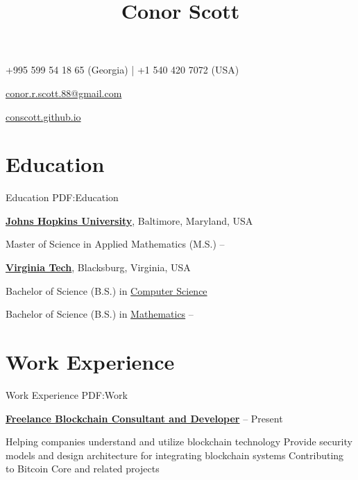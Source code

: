 \documentclass[a4paper,10pt,oneside]{article}
\begin{document}
\begin{minipage}[t][0pt]{\linewidth}


\title{Conor Scott}

\begin{subtitle}
+995 599 54 18 65 (Georgia) | +1 540 420 7072 (USA)
\par
\href{mailto:conor.r.scott.88@gmail.com}
{conor.r.scott.88@gmail.com}
\par
\href{https://conscott.github.io}
{conscott.github.io}
\end{subtitle}
\begin{body}


\section
{Education}
{Education}
{PDF:Education}

\href{https://www.jhu.edu/}
{\textbf{Johns Hopkins University}},
Baltimore, Maryland, USA

\SmallEntryGap
Master of Science in Applied Mathematics (M.S.)
\hfill
{} --

\EntryGap
\href{https://www.vt.edu/}
{\textbf{Virginia Tech}},
Blacksburg, Virginia, USA
\par
Bachelor of Science (B.S.) in
\href{https://www.cs.vt.edu/}
{Computer Science}
\par
Bachelor of Science (B.S.) in
\href{https://www.math.vt.edu/}
{Mathematics}
\hfill
{} --

\section
{Work Experience}
{Work Experience}
{PDF:Work}

\href{https://conscott.github.io}
{\textbf{Freelance Blockchain Consultant and Developer}}
\hfill
{} -- Present
\begin{detail}
\BulletItem Helping companies understand and utilize blockchain technology
\BulletItem Provide security models and design architecture for integrating blockchain systems
\BulletItem Contributing to Bitcoin Core and related projects
\end{detail}



\end{body}
\end{minipage}
\end{document}
